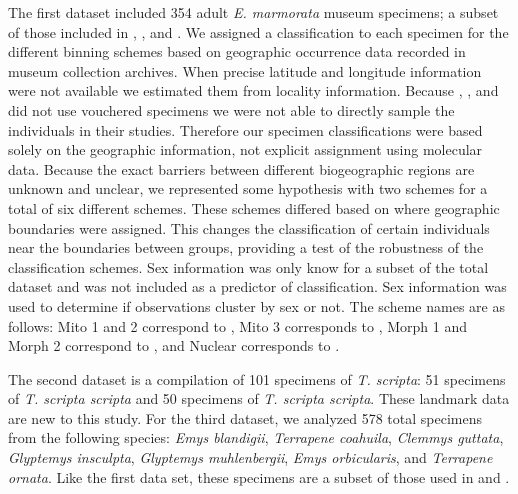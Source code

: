 \documentclass[12pt,letterpaper]{article}
\begin{document}
The first dataset included 354 adult \textit{E. marmorata} museum specimens; a subset of those included in \citet{Angielczyk2007}, \citet{Angielczyk2011}, and \citet{Angielczyk2013a}. We assigned a classification to each specimen for the different binning schemes based on geographic occurrence data recorded in museum collection archives. When precise latitude and longitude information were not available we estimated them from locality information. Because \citet{Spinks2005}, \citet{Spinks2010}, and \citet{Spinks2014} did not use vouchered specimens we were not able to directly sample the individuals in their studies. Therefore our specimen classifications were based solely on the geographic information, not explicit assignment using molecular data. Because the exact barriers between different biogeographic regions are unknown and unclear, we represented some hypothesis with two schemes for a total of six different schemes. These schemes differed based on where geographic boundaries were assigned. This changes the classification of certain individuals near the boundaries between groups, providing a test of the robustness of the classification schemes. Sex information was only know for a subset of the total dataset and was not included as a predictor of classification. Sex information was used to determine if observations cluster by sex or not. The scheme names are as follows: Mito 1 and 2 correspond to \citet{Spinks2005}, Mito 3 corresponds to \citet{Spinks2010}, Morph 1 and Morph 2 correspond to \citet{Holland1992}, and Nuclear corresponds to \citet{Spinks2014}. 

The second dataset is a compilation of 101 specimens of \textit{T. scripta}: 51 specimens of \textit{T. scripta scripta} and 50 specimens of \textit{T. scripta scripta}. These landmark data are new to this study. For the third dataset, we analyzed 578 total specimens from the following species: \textit{Emys blandigii}, \textit{Terrapene coahuila}, \textit{Clemmys guttata}, \textit{Glyptemys insculpta}, \textit{Glyptemys muhlenbergii}, \textit{Emys orbicularis}, and \textit{Terrapene ornata}. Like the first data set, these specimens are a subset of those used in \citet{Angielczyk2011} and \citet{Angielczyk2013a}.
\end{document}
